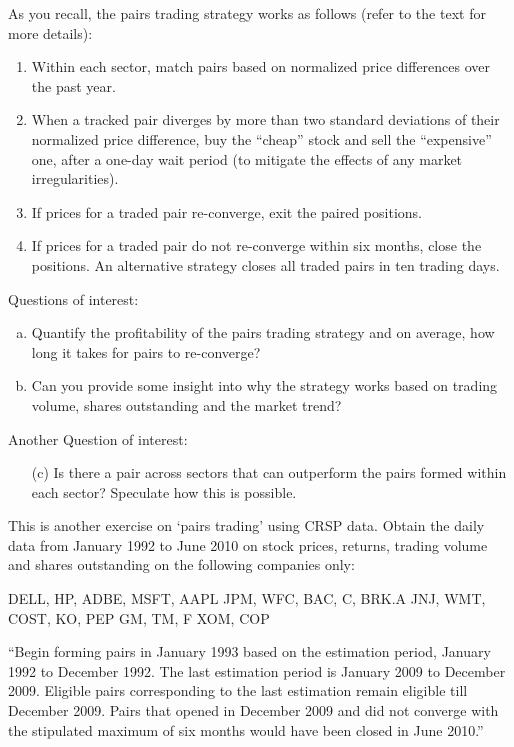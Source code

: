 As you recall, the pairs trading strategy works as follows (refer to the text for more details):
	\begin{enumerate}[--]
	\item Within each sector, match pairs based on normalized price differences over the past year.
	\item When a tracked pair diverges by more than two standard deviations of their normalized price difference, buy the ``cheap'' stock and sell the ``expensive'' one, after a one-day wait period (to mitigate the effects of any market irregularities).
	\item If prices for a traded pair re-converge, exit the paired positions.
	\item If prices for a traded pair do not re-converge within six months, close the positions. An alternative strategy closes all traded pairs in ten trading days.
	\end{enumerate}

\noindent Questions of interest:
	\begin{enumerate}[(a)]
	\item Quantify the profitability of the pairs trading strategy and on average, how long it takes for pairs to re-converge?
	\item Can you provide some insight into why the strategy works based on trading volume, shares outstanding and the market trend?
	\end{enumerate}

\noindent Another Question of interest:

	\begin{enumerate}
	\item[(c)] Is there a pair across sectors that can outperform the pairs formed within each sector? Speculate how this is possible. \twomedskip
	\end{enumerate}


\prob  This is another exercise on `pairs trading' using CRSP data. Obtain the daily data from January 1992 to June 2010 on stock prices, returns, trading volume and shares outstanding on the following companies only:

\indent DELL, HP, ADBE, MSFT, AAPL\hfill \break
\indent JPM, WFC, BAC, C, BRK.A\hfill \break
\indent JNJ, WMT, COST, KO, PEP\hfill \break
\indent GM, TM, F\hfill \break
\indent XOM, COP 

``Begin forming pairs in January 1993 based on the estimation period, January 1992 to December 1992. The last estimation period is January 2009 to December 2009. Eligible pairs corresponding to the last estimation remain eligible till December 2009. Pairs that opened in December 2009 and did not converge with the stipulated maximum of six months would have been closed in June 2010.'' \twomedskip

